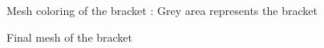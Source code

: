 %
\begin{figure}
    \centering
    \caption[Mesh coloring of the bracket]{Mesh coloring of the bracket : Grey area represents the bracket}
    \label{qdt_fig:ex_chole_mesh_coloring}
\end{figure}
%
\begin{figure}
    \centering
    \caption[Final mesh of the bracket]{Final mesh of the bracket}
    \label{qdt_fig:ex_chole_mesh_final}
\end{figure}
